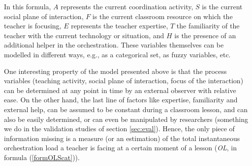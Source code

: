 \documentclass[10pt,journal,compsoc]{IEEEtran}
\begin{document}
In this formula, $A$ represents the current coordination activity, $S$ is the current social plane of interaction, $F$ is the current classroom resource on which the teacher is focusing, $E$ represents the teacher expertise, $T$ the familiarity of the teacher with the current technology or situation, and $H$ is the presence of an additional helper in the orchestration. These variables themselves can be modelled in different ways, e.g., as a categorical set, as fuzzy variables, etc. 






One interesting property of the model presented above is that the process variables (teaching activity, social plane of interaction, focus of the interaction) can be determined at any point in time by an external observer with relative ease. On the other hand, the last line of factors like expertise, familiarity and external help, can be assumed to be constant during a classroom lesson, and can also be easily determined, or can even be manipulated by researchers (something we do in the validation studies of section \ref{sec:eval}). Hence, the only piece of information missing is a measure (or an estimation) of the total instantaneous orchestration load a teacher is facing at a certain moment of a lesson (\textit{OL}, in formula (\ref{formOLScat})).
\end{document}
